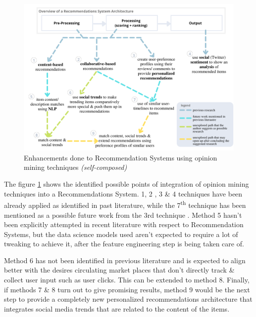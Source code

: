 \documentclass[manuscript,screen,review]{acmart}
\begin{document}
\begin{figure}[h]
\centering
\includegraphics[width=\textwidth]{images/Enhanced Recommendation Systems.png}
\caption{Enhancements done to Recommendation Systems using opinion mining techniques \textit{(self-composed)}}
\label{fig:recommendation-opinion-mining-enhancements}
\end{figure}

The figure \ref{fig:recommendation-opinion-mining-enhancements} shows the identified possible points of integration of opinion mining techniques into a Recommendations System.
1, 2 \cite{linden_amazoncom_2003, larry_history_2019}, 3 \cite{cheng_hybrid_2020} \& 4 \cite{ayushi_cross-domain_2018} techniques have been already applied as identified in past literature, while the 7\textsuperscript{th} technique has been mentioned as a possible future work from the 3rd technique \cite{chen_user_2019}. Method 5 hasn't been explicitly attempted in recent literature with respect to Recommendation Systems, but the data science models used aren't expected to require a lot of tweaking to achieve it, after the feature engineering step is being taken care of.

Method 6 has not been identified in previous literature and is expected to align better with the desires circulating market places that don't directly track \& collect user input such as user clicks. This can be extended to method 8. Finally, if methods 7 \& 8 turn out to give promising results, method 9 would be the next step to provide a completely new personalized recommendations architecture that integrates social media trends that are related to the content of the items.
\end{document}

